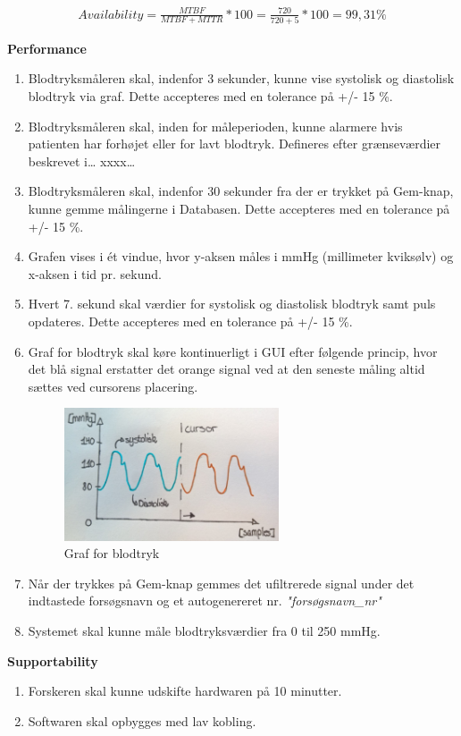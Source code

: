 				\begin{align}
					Availability = \frac{MTBF}{MTBF+MTTR}*100 = \frac{720}{720+5}*100 = 99,31 \%
				\end{align}



\textbf{Performance}
\begin{enumerate}
\item Blodtryksmåleren skal, indenfor 3 sekunder, kunne vise systolisk og diastolisk blodtryk via graf. Dette accepteres med en tolerance på +/- 15 \%.
\item Blodtryksmåleren skal, inden for måleperioden, kunne alarmere hvis patienten har forhøjet eller for lavt blodtryk. Defineres efter grænseværdier beskrevet i… xxxx…
\item Blodtryksmåleren skal, indenfor 30 sekunder fra der er trykket på Gem-knap, kunne gemme målingerne i Databasen.  Dette accepteres med en tolerance på +/- 15 \%.
\item Grafen vises i ét vindue, hvor y-aksen måles i mmHg (millimeter kviksølv) og x-aksen i tid pr. sekund. 
\item Hvert 7. sekund skal værdier for systolisk og diastolisk blodtryk samt puls opdateres. Dette accepteres med en tolerance på +/- 15 \%.
\item Graf for blodtryk skal køre kontinuerligt i GUI efter følgende princip, hvor det blå signal erstatter det orange signal ved at den seneste måling altid sættes ved cursorens placering.
\begin{figure}[H]
	\centering
	\includegraphics[width=0.6\textwidth]{Figurer/Cursor}
	\caption{Graf for blodtryk}
	\label{fig:Graf for blodtryks visning}
\end{figure}

\item Når der trykkes på Gem-knap gemmes det ufiltrerede signal under det indtastede forsøgsnavn og et autogenereret nr. \textit{"forsøgsnavn\_nr"}
\item Systemet skal kunne måle blodtryksværdier fra 0 til 250 mmHg.
\end{enumerate}


\textbf{Supportability}
\begin{enumerate}
\item Forskeren skal kunne udskifte hardwaren på 10 minutter. 
\item Softwaren skal opbygges med lav kobling. 
\end{enumerate}
















